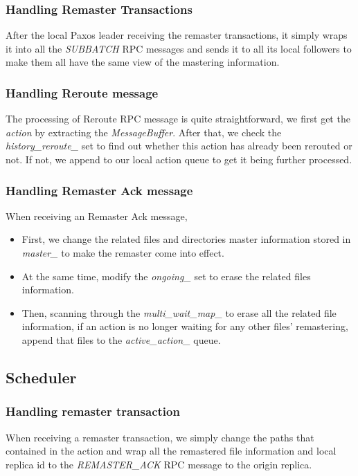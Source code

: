 \subsubsection{Handling Remaster Transactions}
After the local Paxos leader receiving the remaster transactions, it simply wraps it into all the \emph{SUBBATCH} RPC messages and sends it to all its local followers to make them all have the same view of the mastering information. 

\subsubsection{Handling Reroute message}
The processing of Reroute RPC message is quite straightforward, we first get the \emph{action} by extracting the \emph{MessageBuffer}. After that, we check the \emph{history\_reroute\_} set to find out whether this action has already been rerouted or not. If not, we append to our local action queue to get it being further processed.

\subsubsection{Handling Remaster Ack message}
When receiving an Remaster Ack message, 
\begin{itemize}
\item First, we change the related files and directories master information stored in \emph{master\_} to make the remaster come into effect. 

\item At the same time, modify the \emph{ongoing\_} set to erase the related files information.

\item Then, scanning through the \emph{multi\_wait\_map\_} to erase all the related file information, if an action is no longer waiting for any other files' remastering, append that files to the \emph{active\_action\_} queue.
\end{itemize}

\subsection{Scheduler}
\subsubsection{Handling remaster transaction}
When receiving a remaster transaction, we simply change the paths that contained in the action and wrap all the remastered file information and local replica id to the \emph{REMASTER\_ACK} RPC message to the origin replica. 

